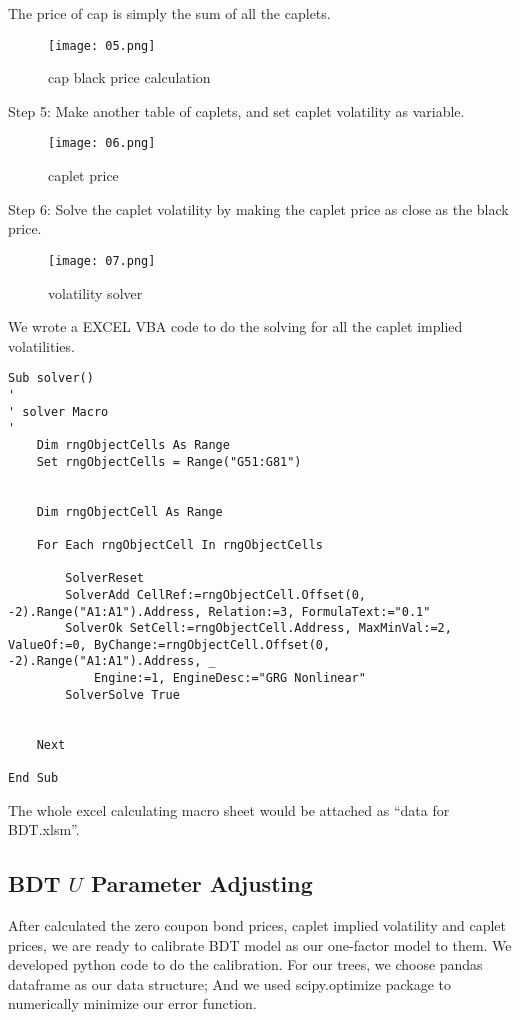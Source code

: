 \documentclass[paper = letterpaper, fontsize=12pt]{article}
\begin{document}
The price of cap is simply the sum of all the caplets.
\begin{figure}[H]
    \centering
    \texttt{[image: 05.png]}
    \caption{cap black price calculation}
\end{figure}
 
Step 5: Make another table of caplets, and set caplet volatility as variable.
\begin{figure}[H]
    \centering
    \texttt{[image: 06.png]}
    \caption{caplet price}
\end{figure}
  
Step 6: Solve the caplet volatility by making the caplet price as close as the black price.
\begin{figure}[H]
    \centering
    \texttt{[image: 07.png]}
    \caption{volatility solver}
\end{figure}

 We wrote a EXCEL VBA code to do the solving for all the caplet implied volatilities.
 
\begin{minipage}{\linewidth}
\begin{lstlisting}[style=VBA]
Sub solver()
'
' solver Macro
'
    Dim rngObjectCells As Range
    Set rngObjectCells = Range("G51:G81")


    Dim rngObjectCell As Range

    For Each rngObjectCell In rngObjectCells

        SolverReset
        SolverAdd CellRef:=rngObjectCell.Offset(0, -2).Range("A1:A1").Address, Relation:=3, FormulaText:="0.1"
        SolverOk SetCell:=rngObjectCell.Address, MaxMinVal:=2, ValueOf:=0, ByChange:=rngObjectCell.Offset(0, -2).Range("A1:A1").Address, _
            Engine:=1, EngineDesc:="GRG Nonlinear"
        SolverSolve True


    Next

End Sub

\end{lstlisting} 
\end{minipage}
	
The whole excel calculating macro sheet would be attached as “data for BDT.xlsm”.

\subsection{BDT $U$ Parameter Adjusting}
After calculated the zero coupon bond prices, caplet implied volatility and caplet prices, we are ready to calibrate BDT model as our one-factor model to them. We developed python code to do the calibration. For our trees, we choose pandas dataframe as our data structure; And we used scipy.optimize package to numerically minimize our error function. 
\end{document}
